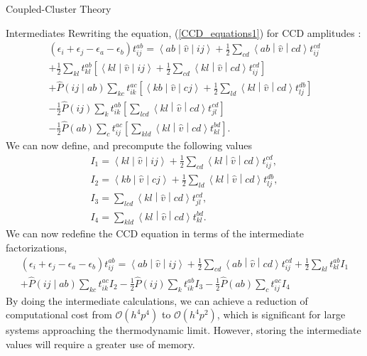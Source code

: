 \documentclass[twoside,english]{uiofysmaster}
\begin{document}
\begin{chapter}{Coupled-Cluster Theory}
\begin{section}{Intermediates}
  		Rewriting the equation, (\ref{CCD_equations1}) for CCD amplitudes \cite{Baardsen,Audun}:
  		\begin{align}
  			(\epsilon_i + \epsilon_j - \epsilon_a - \epsilon_b) t_{ij}^{ab} = \left<ab\middle|\hat v\middle|ij\right> + \frac{1}{2} \sum_{cd}\left<ab\middle|\hat v\middle|cd\right>t_{ij}^{cd} \\
  			+ \frac{1}{2} \sum_{kl} t_{kl}^{ab} \left[ \left<kl\middle|\hat v\middle|ij\right> + \frac{1}{2} \sum_{cd} \left<kl\middle|\hat v\middle|cd\right> t_{ij}^{cd} \right] \nonumber\\
  			+ \hat P\left(ij\middle|ab\right) \sum_{kc} t_{ik}^{ac} \left[ \left<kb\middle|\hat v\middle|cj\right> + \frac{1}{2}\sum_{ld}\left<kl\middle|\hat v\middle|cd\right>t_{lj}^{db} \right] \nonumber\\
  			- \frac{1}{2} \hat P(ij) \sum_{k} t_{ik}^{ab} \left[ \sum_{lcd} \left<kl\middle|\hat v\middle|cd\right> t_{jl}^{cd} \right] \nonumber\\
  			- \frac{1}{2} \hat P(ab) \sum_{c} t_{ij}^{ac} \left[ \sum_{kld} \left<kl\middle|\hat v\middle|cd\right> t_{kl}^{bd} \right]. \nonumber
  		\end{align}
  		We can now define, and precompute the following values
  		\begin{align}
  			I_1 = \left<kl\middle|\hat v\middle|ij\right> + \frac{1}{2} \sum_{cd} \left<kl\middle|\hat v\middle|cd\right> t_{ij}^{cd}, \\
  			I_2 = \left<kb\middle|\hat v\middle|cj\right> + \frac{1}{2}\sum_{ld}\left<kl\middle|\hat v\middle|cd\right>t_{lj}^{db} ,\\
  			I_3 = \sum_{lcd} \left<kl\middle|\hat v\middle|cd\right> t_{jl}^{cd} ,\\
  			I_4 = \sum_{kld} \left<kl\middle|\hat v\middle|cd\right> t_{kl}^{bd}. 
  		\end{align}
  		We can now redefine the CCD equation in terms of the intermediate factorizations, 
  		\begin{align}
  			(\epsilon_i + \epsilon_j - \epsilon_a - \epsilon_b) t_{ij}^{ab} = \left<ab\middle|\hat v\middle|ij\right> + \frac{1}{2} \sum_{cd}\left<ab\middle|\hat v\middle|cd\right>t_{ij}^{cd} + \frac{1}{2} \sum_{kl} t_{kl}^{ab} I_1 \\
  			+ \hat P\left(ij\middle|ab\right) \sum_{kc} t_{ik}^{ac} I_2 - \frac{1}{2} \hat P(ij) \sum_{k} t_{ik}^{ab} I_3  - \frac{1}{2} \hat P(ab) \sum_{c} t_{ij}^{ac} I_4 \nonumber
  			\label{Intermediates}
  		\end{align}
  		By doing the intermediate calculations, we can achieve a reduction of computational cost from $\mathcal{O}(h^4 p^4)$ to $\mathcal{O}(h^4 p^2)$, which is significant for large systems approaching the thermodynamic limit. However, storing the intermediate values will require a greater use of memory. 

  	\end{section}

\end{chapter}
\end{document}
